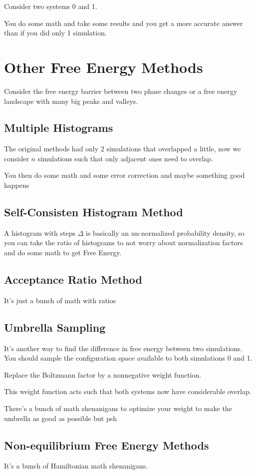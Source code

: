 \documentclass[fleqn]{report}
\begin{document}
Consider two systems 0 and 1. 

You do some math and take some results and you get a more 
accurate answer than if you did only 1 simulation. 

\section{Other Free Energy Methods}
Consider the free energy barrier between two phase 
changes or a free energy landscape with many big peaks and valleys. 

\subsection{Multiple Histograms}
The original methods had only 2 simulations that overlapped a little, now 
we consider $n$ simulations such that only adjacent ones need to overlap. 

You then do some math and some error correction and maybe 
something good happens 

\subsection{Self-Consisten Histogram Method}
A histogram with steps $\Delta$ is basically an un-normalized 
probability density, so you can take the ratio of histograms to not worry 
about normalization factors and do some math to get Free Energy. 

\subsection{Acceptance Ratio Method}
It's just a bunch of math with ratios 

\subsection{Umbrella Sampling}
It's another way to find the difference in free energy between two simulations. 
You should sample the configuration space available to both simulations 0 and 1. 

Replace the Boltzmann factor by a nonnegative weight function. 

This weight function acts such that both systems now have considerable 
overlap. 

There's a bunch of math shenanigans to optimize your weight to make 
the umbrella as good as possible but psh 

\subsection{Non-equilibrium Free Energy Methods}
It's a bunch of Hamiltonian math shenanigans. 
\end{document}
